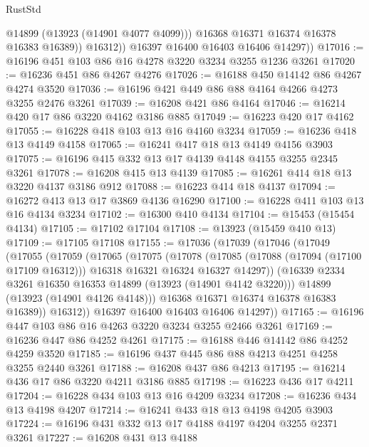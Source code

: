 \begin{lexlean}{RustStd}
\begin{coremodule}
                  @14899
                  (@13923 (@14901 @4077 @4099)))
                @16368
                @16371
                @16374
                @16378
                @16383
                @16389))
            @16312))
        @16397
        @16400
        @16403
        @16406
        @14297))
@17016 := @16196 @451 @103 @86 @16 @4278 @3220 @3234 @3255 @1236 @3261
@17020 := @16236 @451 @86 @4267 @4276
@17026 := @16188 @450 @14142 @86 @4267 @4274 @3520
@17036 := @16196 @421 @449 @86 @88 @4164 @4266 @4273 @3255 @2476 @3261
@17039 := @16208 @421 @86 @4164
@17046 := @16214 @420 @17 @86 @3220 @4162 @3186 @885
@17049 := @16223 @420 @17 @4162
@17055 := @16228 @418 @103 @13 @16 @4160 @3234
@17059 := @16236 @418 @13 @4149 @4158
@17065 := @16241 @417 @18 @13 @4149 @4156 @3903
@17075 := @16196 @415 @332 @13 @17 @4139 @4148 @4155 @3255 @2345 @3261
@17078 := @16208 @415 @13 @4139
@17085 := @16261 @414 @18 @13 @3220 @4137 @3186 @912
@17088 := @16223 @414 @18 @4137
@17094 := @16272 @413 @13 @17 @3869 @4136 @16290
@17100 := @16228 @411 @103 @13 @16 @4134 @3234
@17102 := @16300 @410 @4134
@17104 := @15453 (@15454 @4134)
@17105 := @17102 @17104
@17108 := @13923 (@15459 @410 @13)
@17109 := @17105 @17108
@17155 := @17036
    (@17039
      (@17046
        (@17049
          (@17055
            (@17059
              (@17065
                (@17075
                  (@17078
                    (@17085
                      (@17088 (@17094 (@17100 @17109 @16312)))
                      @16318
                      @16321
                      @16324
                      @16327
                      @14297))
                  (@16339 @2334 @3261 @16350 @16353 @14899 (@13923 (@14901 @4142 @3220)))
                  @14899
                  (@13923 (@14901 @4126 @4148)))
                @16368
                @16371
                @16374
                @16378
                @16383
                @16389))
            @16312))
        @16397
        @16400
        @16403
        @16406
        @14297))
@17165 := @16196 @447 @103 @86 @16 @4263 @3220 @3234 @3255 @2466 @3261
@17169 := @16236 @447 @86 @4252 @4261
@17175 := @16188 @446 @14142 @86 @4252 @4259 @3520
@17185 := @16196 @437 @445 @86 @88 @4213 @4251 @4258 @3255 @2440 @3261
@17188 := @16208 @437 @86 @4213
@17195 := @16214 @436 @17 @86 @3220 @4211 @3186 @885
@17198 := @16223 @436 @17 @4211
@17204 := @16228 @434 @103 @13 @16 @4209 @3234
@17208 := @16236 @434 @13 @4198 @4207
@17214 := @16241 @433 @18 @13 @4198 @4205 @3903
@17224 := @16196 @431 @332 @13 @17 @4188 @4197 @4204 @3255 @2371 @3261
@17227 := @16208 @431 @13 @4188

\end{coremodule}
\end{lexlean}
